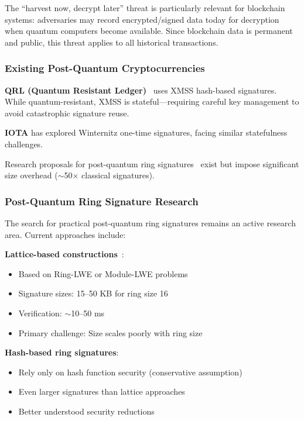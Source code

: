 The ``harvest now, decrypt later'' threat is particularly relevant for
blockchain systems: adversaries may record encrypted/signed data today
for decryption when quantum computers become available. Since blockchain
data is permanent and public, this threat applies to all historical
transactions.

\subsubsection{Existing Post-Quantum Cryptocurrencies}

\textbf{QRL (Quantum Resistant Ledger)}~\cite{qrl} uses XMSS hash-based
signatures. While quantum-resistant, XMSS is stateful---requiring careful
key management to avoid catastrophic signature reuse.

\textbf{IOTA} has explored Winternitz one-time signatures, facing similar
statefulness challenges.

Research proposals for post-quantum ring signatures~\cite{pq-ring-sig,pqringsurvey}
exist but impose significant size overhead
($\sim$50$\times$ classical signatures).

\subsubsection{Post-Quantum Ring Signature Research}

The search for practical post-quantum ring signatures remains an active
research area. Current approaches include:

\textbf{Lattice-based constructions}~\cite{lattice-ring-sig}:
\begin{itemize}
  \item Based on Ring-LWE or Module-LWE problems
  \item Signature sizes: 15--50 KB for ring size 16
  \item Verification: $\sim$10--50 ms
  \item Primary challenge: Size scales poorly with ring size
\end{itemize}

\textbf{Hash-based ring signatures}:
\begin{itemize}
  \item Rely only on hash function security (conservative assumption)
  \item Even larger signatures than lattice approaches
  \item Better understood security reductions
\end{itemize}

